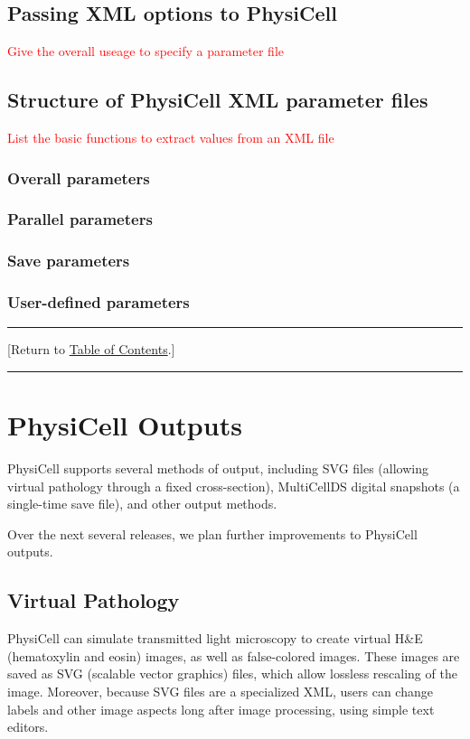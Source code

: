 \documentclass[12pt]{article}
\newcommand{\red}[1]{\textcolor{red}{#1}}
\newcommand{\blue}[1]{\textcolor{blue}{#1}}
\newcommand{\DONE}{}%
\newcommand{\TOClink}{\begin{center}\hrule\vskip-10pt\phantom{.}\hfill[Return to \hyperlink{TOC}{Table of Contents}.]\hfill\phantom{.}\vskip3pt\hrule\end{center}}
\begin{document}
\subsection{Passing XML options to PhysiCell}
\label{sec:XML_options}
\red{Give the overall useage to specify a parameter file}

\subsection{Structure of PhysiCell XML parameter files}
\label{sec:XML_PhysiCell_structure}
\red{List the basic functions to extract values from an XML file}

\subsubsection{Overall parameters}

\subsubsection{Parallel parameters}

\subsubsection{Save parameters}

\subsubsection{User-defined parameters}




\TOClink 

\section{PhysiCell Outputs \DONE}
\label{sec:Outputs}
PhysiCell supports several methods of output, including 
SVG files (allowing virtual pathology through a fixed cross-section), 
MultiCellDS digital snapshots (a single-time save file), 
and other output methods. 

Over the next several releases, we plan further improvements to 
PhysiCell outputs. 

\subsection{Virtual Pathology} 
\label{sec:Pathology}
PhysiCell can simulate transmitted light microscopy 
to create virtual H\&E (hematoxylin and eosin) images, 
as well as false-colored images. These images 
are saved as SVG (scalable vector graphics) files, 
which allow lossless rescaling of the image. Moreover, 
because SVG files are a specialized XML, users can 
change labels and other image aspects long after image processing, 
using simple text editors. 
\end{document}
